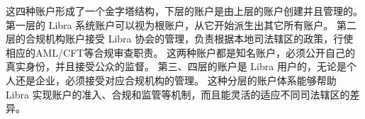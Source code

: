 这四种账户形成了一个金字塔结构，下层的账户是由上层的账户创建并且管理的。
第一层的 Libra 系统账户可以视为根账户，从它开始派生出其它所有账户。
第二层的合规机构账户接受 Libra 协会的管理，负责根据本地司法辖区的政策，行使相应的AML/CFT等合规审查职责。
这两种账户都是知名账户，必须公开自己的真实身份，并且接受公众的监督。
第三、四层的账户是 Libra 用户的，无论是个人还是企业，必须接受对应合规机构的管理。
这种分层的账户体系能够帮助 Libra 实现账户的准入、合规和监管等机制，而且能灵活的适应不同司法辖区的差异。
